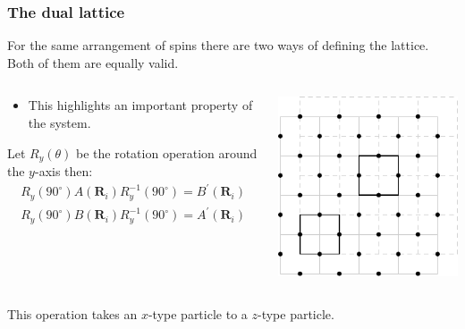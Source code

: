 \documentclass{beamer}
\renewcommand{\(}{\left(}
\renewcommand{\)}{\right)}
\renewcommand{\[}{\left[}
\renewcommand{\]}{\right]}
\begin{document}
\begin{frame}
    \frametitle{The dual lattice}

    For the same arrangement of spins there are two ways of defining the lattice. Both of them are equally valid. 
    \begin{columns}
        \begin{column}{0.55\textwidth}
            \begin{itemize}
                \item This highlights an important property of the system. 
            \end{itemize}
            Let $R_y(\theta)$ be the rotation operation around the $y$-axis then: 
            \begin{align*}
                R_y(90^\circ) A(\bm R_i) R^{-1}_y(90^\circ) = B^\prime(\bm R_i) \\
                R_y(90^\circ) B(\bm R_i) R^{-1}_y(90^\circ) = A^\prime(\bm R_i)
            \end{align*}
        \end{column}
        \begin{column}{0.45\textwidth}
            \begin{center}
            \includegraphics[scale=0.9]{dual_lattice.pdf}
            \end{center}
        \end{column}
    \end{columns}

    \begin{framed}
    This operation takes an $x$-type particle to a $z$-type particle. 
    \end{framed}

\end{frame}
\end{document}
